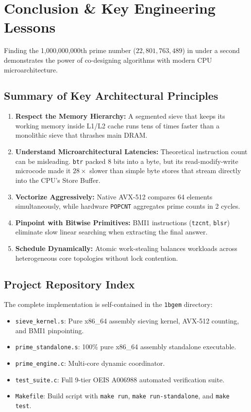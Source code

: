 \documentclass[11pt,a4paper]{article}
\begin{document}
\section{Conclusion \& Key Engineering Lessons}

Finding the 1,000,000,000th prime number ($22,801,763,489$) in under a second demonstrates the power of co-designing algorithms with modern CPU microarchitecture.

\subsection{Summary of Key Architectural Principles}
\begin{enumerate}\setlength{\itemsep}{1pt}
    \item \textbf{Respect the Memory Hierarchy:} A segmented sieve that keeps its working memory inside L1/L2 cache runs tens of times faster than a monolithic sieve that thrashes main DRAM.
    \item \textbf{Understand Microarchitectural Latencies:} Theoretical instruction count can be misleading. \texttt{btr} packed 8 bits into a byte, but its read-modify-write microcode made it $28\times$ slower than simple byte stores that stream directly into the CPU's Store Buffer.
    \item \textbf{Vectorize Aggressively:} Native AVX-512 compares 64 elements simultaneously, while hardware \texttt{POPCNT} aggregates prime counts in 2 cycles.
    \item \textbf{Pinpoint with Bitwise Primitives:} BMI1 instructions (\texttt{tzcnt}, \texttt{blsr}) eliminate slow linear searching when extracting the final answer.
    \item \textbf{Schedule Dynamically:} Atomic work-stealing balances workloads across heterogeneous core topologies without lock contention.
\end{enumerate}

\subsection{Project Repository Index}
The complete implementation is self-contained in the \texttt{1bgem} directory:
\begin{itemize}\setlength{\itemsep}{0pt}
    \item \texttt{sieve\_kernel.s}: Pure x86\_64 assembly sieving kernel, AVX-512 counting, and BMI1 pinpointing.
    \item \texttt{prime\_standalone.s}: 100\% pure x86\_64 assembly standalone executable.
    \item \texttt{prime\_engine.c}: Multi-core dynamic coordinator.
    \item \texttt{test\_suite.c}: Full 9-tier OEIS A006988 automated verification suite.
    \item \texttt{Makefile}: Build script with \texttt{make run}, \texttt{make run-standalone}, and \texttt{make test}.
\end{itemize}
\end{document}
